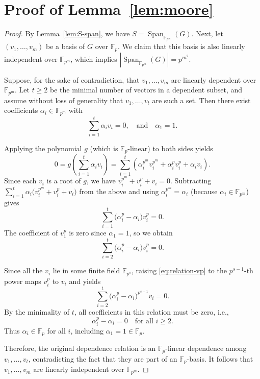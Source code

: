 \documentclass[11pt]{article}
\theoremstyle{plain}
\theoremstyle{definition}
\newcommand{\abs}[1]{\left|#1\right|}
\DeclareMathOperator{\Span}{Span}
\begin{document}
\section{Proof of Lemma~\ref{lem:moore}}
\label{Proof of Lemma moore}
\begin{proof}
By Lemma~\ref{lem:S-span}, we have $S=\Span_{\mathbb{F}_{p^m}}(G)$.
Next, let $(v_1, \ldots, v_m)$ be a basis of $G$ over $\mathbb{F}_p$. We claim that this basis is also linearly independent over $\mathbb{F}_{p^m}$, which implies
$\abs{\Span_{\mathbb{F}_{p^m}}(G)} = p^{m^2}$.


Suppose, for the sake of contradiction, that \(v_1, \ldots, v_m\) are linearly dependent over \(\mathbb{F}_{p^m}\).  
Let \(t \ge 2\) be the minimal number of vectors in a dependent subset, and assume without loss of generality that \(v_1, \ldots, v_t\) are such a set. Then there exist coefficients \(\alpha_i \in \mathbb{F}_{p^m}\) with
\[
\sum_{i=1}^t \alpha_i v_i = 0, 
\quad \text{and} \quad \alpha_1 = 1.
\]

Applying the polynomial \(g\) (which is \(\mathbb{F}_p\)-linear) to both sides yields
\[
0 
= g\!\left( \sum_{i=1}^t \alpha_i v_i \right) 
= \sum_{i=1}^t \left( \alpha_i^{p^m} v_i^{p^m} + \alpha_i^p v_i^p + \alpha_i v_i \right).
\]
Since each \(v_i\) is a root of \(g\), we have \(v_i^{p^m} + v_i^p + v_i = 0\).  
Subtracting \(\sum_{i=1}^t \alpha_i\big( v_i^{p^m} + v_i^p + v_i \big)\) from the above and using \(\alpha_i^{p^m} = \alpha_i\) (because \(\alpha_i \in \mathbb{F}_{p^m}\)) gives
\[
\sum_{i=1}^t \big( \alpha_i^p - \alpha_i \big) v_i^p = 0.
\]
The coefficient of \(v_1^p\) is zero since \(\alpha_1 = 1\), so we obtain
\begin{equation}
\label{eq:relation-vp}
\sum_{i=2}^t \big( \alpha_i^p - \alpha_i \big) v_i^p = 0.
\end{equation}

Since all the $v_i$ lie in some finite field $\mathbb{F}_{p^s}$, raising \eqref{eq:relation-vp} to the $p^{s-1}$-th power maps $v_i^p$ to $v_i$ and yields
\[
\sum_{i=2}^t \big( \alpha_i^p - \alpha_i \big)^{p^{s-1}} v_i = 0.
\]
By the minimality of \(t\), all coefficients in this relation must be zero, i.e.,
\[
\alpha_i^p - \alpha_i = 0
\quad \text{for all } i \ge 2.
\]
Thus \(\alpha_i \in \mathbb{F}_p\) for all \(i\), including \(\alpha_1 = 1 \in \mathbb{F}_p\).

Therefore, the original dependence relation is an \(\mathbb{F}_p\)-linear dependence among \(v_1, \ldots, v_t\), contradicting the fact that they are part of an \(\mathbb{F}_p\)-basis.  
It follows that \(v_1, \ldots, v_m\) are linearly independent over \(\mathbb{F}_{p^m}\).
\end{proof}
\end{document}
